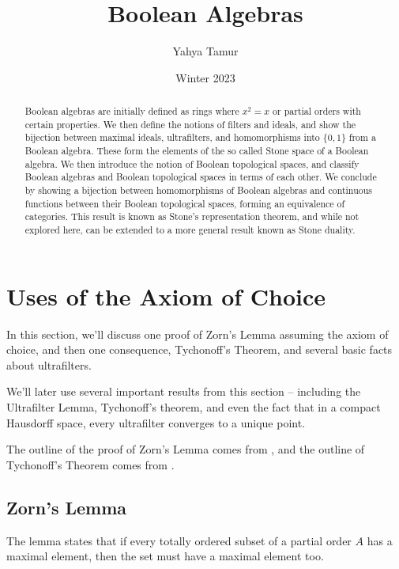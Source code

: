 \documentclass{article}
\title{Boolean Algebras}
\author{Yahya Tamur}
\date{Winter 2023}
\begin{document}
  \maketitle


  \begin{abstract}

    Boolean algebras are initially defined as rings where $x^2 = x$ or partial
    orders with certain properties. We then define the notions of filters and
    ideals, and show the bijection between maximal ideals, ultrafilters, and
    homomorphisms into $\{0,1\}$ from a Boolean algebra. These form the elements
    of the so called Stone space of a Boolean algebra. We then introduce the
    notion of Boolean topological spaces, and classify Boolean algebras and
    Boolean topological spaces in terms of each other. We conclude by showing a
    bijection between homomorphisms of Boolean algebras and continuous functions
    between their Boolean topological spaces, forming an equivalence of
    categories. This result is known as Stone's representation theorem, and
    while not explored here, can be extended to a more general result known as
    Stone duality.

  \end{abstract}

    \section{Uses of the Axiom of Choice}

      In this section, we'll discuss one proof of Zorn's Lemma assuming the
      axiom of choice, and then one consequence, Tychonoff's Theorem, and
      several basic facts about ultrafilters.

      We'll later use several important results from this section -- including
      the Ultrafilter Lemma, Tychonoff's theorem, and even the fact that in a
      compact Hausdorff space, every ultrafilter converges to a unique point.

      The outline of the proof of Zorn's Lemma comes from \cite{zorn}, and the
      outline of Tychonoff's Theorem comes from \cite{tych}.

      \subsection{Zorn's Lemma}

        The lemma states that if every totally ordered subset of a partial order
        $A$ has a maximal element, then the set must have a maximal element too.
\end{document}

